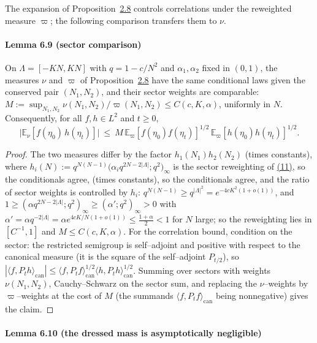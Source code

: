 \documentclass[11pt]{article}
\theoremstyle{plain}
\theoremstyle{definition}
\theoremstyle{remark}
\newcommand{\E}{\mathbb{E}}\newcommand{\PP}{\mathbb{P}}\newcommand{\dd}{\,\mathrm{d}}
\begin{document}
The expansion of Proposition~\hyperref[prop_orth]{2.8} controls correlations under the
reweighted measure $\varpi$; the following comparison transfers them to $\nu$.

\paragraph{Lemma 6.9 (sector comparison)}\label{lem_sector}

On $\Lambda=[-KN,KN]$ with $q=1-c/N^2$ and $\alpha_1,\alpha_2$ fixed in $(0,1)$, the
measures $\nu$ and $\varpi$ of Proposition~\hyperref[prop_orth]{2.8} have the same conditional
laws given the conserved pair $(N_1,N_2)$, and their sector weights are comparable:
$M:=\sup_{N_1,N_2}\nu(N_1,N_2)/\varpi(N_1,N_2)\le C(c,K,\alpha)$, uniformly in $N$.
Consequently, for all $f,h\in L^2$ and $t\ge0$,
\[
  \big|\E_\nu[f(\eta_0)\,h(\eta_t)]\big|\ \le\ M\,
  \E_\varpi[f(\eta_0)f(\eta_t)]^{1/2}\,\E_\varpi[h(\eta_0)h(\eta_t)]^{1/2}.
\]
\par
\begin{proof}
The two measures differ by the factor $h_1(N_1)h_2(N_2)$ (times constants), where
$h_i(N):=q^{N(N-1)}\big(\alpha_i q^{2N-2|\Lambda|};q^2\big)_\infty$ is the sector
reweighting of \hyperref[eq_omegadef]{(11)}, so the conditionals agree,
(times constants), so the conditionals agree, and the ratio of sector weights is
controlled by $h_i$: $q^{N(N-1)}\ge q^{|\Lambda|^2}=e^{-4cK^2(1+o(1))}$, and
$1\ge(\alpha q^{2N-2|\Lambda|};q^2)_\infty\ge(\alpha';q^2)_\infty>0$ with
$\alpha'=\alpha q^{-2|\Lambda|}=\alpha e^{4cK/N(1+o(1))}\le\tfrac{1+\alpha}2<1$ for
$N$ large; so the reweighting lies in $[C^{-1},1]$ and $M\le C(c,K,\alpha)$. For the
correlation bound, condition on the sector: the restricted semigroup is
self--adjoint and positive with respect to the canonical measure (it is the square
of the self--adjoint $P_{t/2}$), so
$|\langle f,P_th\rangle_{\mathrm{can}}|\le
\langle f,P_tf\rangle_{\mathrm{can}}^{1/2}\langle h,P_th\rangle_{\mathrm{can}}^{1/2}$.
Summing over sectors with weights $\nu(N_1,N_2)$, Cauchy--Schwarz on the sector sum,
and replacing the $\nu$--weights by $\varpi$--weights at the cost of $M$ (the
summands $\langle f,P_tf\rangle_{\mathrm{can}}$ being nonnegative) gives the claim.
\end{proof}

\paragraph{Lemma 6.10 (the dressed mass is asymptotically negligible)}\label{lem_eps}
\end{document}
